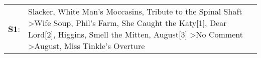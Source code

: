 \begin{supertabular}{p{0.03\textwidth}p{0.92\textwidth}}
 \textbf{S1}:  &  Slacker\textsuperscript{}, \enspace White Man's Moccasins\textsuperscript{}, \enspace Tribute to the Spinal Shaft\textsuperscript{} \textgreater \enspace Wife Soup\textsuperscript{}, \enspace Phil's Farm\textsuperscript{}, \enspace She Caught the Katy[1]\textsuperscript{}, \enspace Dear Lord[2]\textsuperscript{}, \enspace Higgins\textsuperscript{}, \enspace Smell the Mitten\textsuperscript{}, \enspace August[3]\textsuperscript{} \textgreater \enspace No Comment\textsuperscript{} \textgreater \enspace August\textsuperscript{}, \enspace Miss Tinkle's Overture\textsuperscript{}  \enspace  \\
\end{supertabular}
